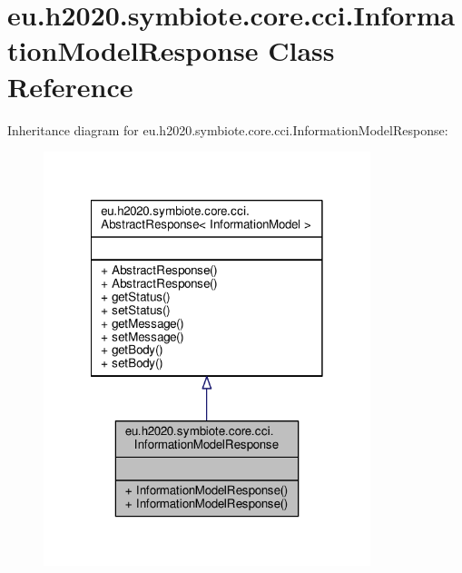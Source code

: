 \hypertarget{classeu_1_1h2020_1_1symbiote_1_1core_1_1cci_1_1InformationModelResponse}{}\section{eu.\+h2020.\+symbiote.\+core.\+cci.\+Information\+Model\+Response Class Reference}
\label{classeu_1_1h2020_1_1symbiote_1_1core_1_1cci_1_1InformationModelResponse}


Inheritance diagram for eu.\+h2020.\+symbiote.\+core.\+cci.\+Information\+Model\+Response\+:\nopagebreak
\begin{figure}[H]
\begin{center}
\leavevmode
\includegraphics[width=270pt]{classeu_1_1h2020_1_1symbiote_1_1core_1_1cci_1_1InformationModelResponse__inherit__graph}
\end{center}
\end{figure}


